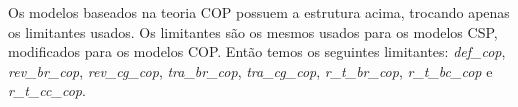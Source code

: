 Os modelos baseados na teoria COP possuem a estrutura acima, trocando
apenas os limitantes usados. Os limitantes são os mesmos usados para
os modelos CSP, modificados para os modelos COP. Então temos os
seguintes limitantes: \textit{def\_cop}, \textit{rev\_br\_cop},
\textit{rev\_cg\_cop}, \textit{tra\_br\_cop}, \textit{tra\_cg\_cop}, 
\textit{r\_t\_br\_cop}, \textit{r\_t\_bc\_cop}
e \textit{r\_t\_cc\_cop}.

\section{\PLI}
\label{sec:cp}
